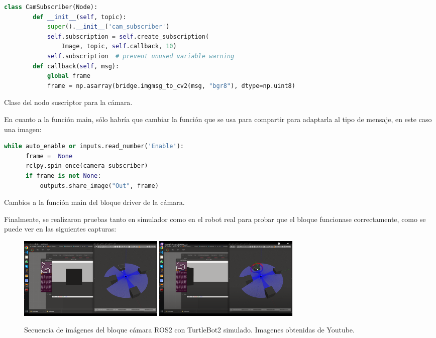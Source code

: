 \begin{code}[H]
  \begin{lstlisting}[language=python]
    class CamSubscriber(Node):
        def __init__(self, topic):
            super().__init__('cam_subscriber')
            self.subscription = self.create_subscription(
                Image, topic, self.callback, 10)
            self.subscription  # prevent unused variable warning
        def callback(self, msg):
            global frame
            frame = np.asarray(bridge.imgmsg_to_cv2(msg, "bgr8"), dtype=np.uint8)
  \end{lstlisting}
  \caption[Clase del nodo suscriptor para cámara]{Clase del nodo suscriptor para la cámara.}
  \label{cod:cam_node_class}
\end{code}
En cuanto a la función main, sólo habría que cambiar la función que se usa para compartir para adaptarla al tipo de mensaje, en este caso una imagen:
\begin{code}[H]
  \begin{lstlisting}[language=python]
  while auto_enable or inputs.read_number('Enable'):
      frame =  None
      rclpy.spin_once(camera_subscriber)
      if frame is not None:
          outputs.share_image("Out", frame)
  \end{lstlisting}
  \caption[Cambios main bloque cámara]{Cambios a la función main del bloque driver de la cámara.}
  \label{cod:cam_main_changes}
\end{code}
Finalmente, se realizaron pruebas tanto en simulador como en el robot real para probar que el bloque funcionase correctamente, como se puede ver en las
siguientes capturas:
\begin{figure} [H]
  \begin{center}
      \includegraphics[width=7cm]{figs/c4/camS1.png}
      \includegraphics[width=7cm]{figs/c4/camS2.png}
  \end{center}
  \caption[Secuencia bloque cámara ROS2 simulado]{Secuencia de imágenes del bloque cámara ROS2 con TurtleBot2 simulado. Imagenes obtenidas de Youtube\footnotemark.}
  \label{fig:vid_camS}
\end{figure}

